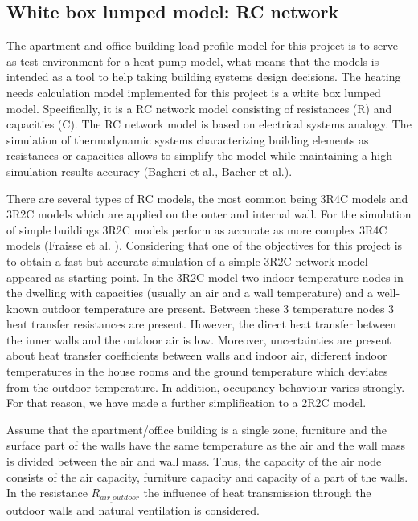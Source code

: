 \subsection{White box lumped model: RC network} 

The apartment and office building load profile model for this project is to serve as test environment for a heat pump model, what means that the models is intended as a tool to help taking building systems design decisions. The heating needs calculation model implemented for this project is a white box lumped model. Specifically, it is a RC network model consisting of resistances (R) and capacities (C). The RC network model is based on electrical systems analogy. The simulation of thermodynamic systems characterizing building elements as resistances or capacities allows to simplify the model while maintaining a high simulation results accuracy (Bagheri et al., Bacher et al.).   

There are several types of RC models, the most common being 3R4C models and 3R2C models which are applied on the outer and internal wall. For the simulation of simple buildings 3R2C models perform as accurate as more complex 3R4C models (Fraisse et al. ). Considering that one of the objectives for this project is to obtain a fast but accurate simulation of a simple 3R2C network model appeared as starting point. In the 3R2C model two indoor temperature nodes in the dwelling with capacities (usually an air and a wall temperature) and a well-known outdoor temperature are present. Between these 3 temperature nodes 3 heat transfer resistances are present. However, the direct heat transfer between the inner walls and the outdoor air is low. Moreover, uncertainties are present about heat transfer coefficients between walls and indoor air, different indoor temperatures in the house rooms and the ground temperature which deviates from the outdoor temperature. In addition, occupancy behaviour varies strongly. For that reason, we have made a further simplification to a 2R2C model. 

Assume that the apartment/office building is a single zone, furniture and the surface part of the walls have the same temperature as the air and the wall mass is divided between the air and wall mass. Thus, the capacity of the air node consists of the air capacity, furniture capacity and capacity of a part of the walls. In the resistance $R_{air_{\_}outdoor}$ the influence of heat transmission through the outdoor walls and natural ventilation is considered. 

